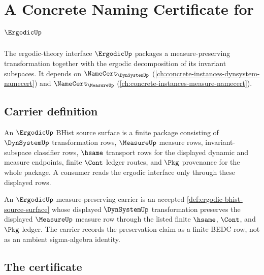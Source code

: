 \chapter{A Concrete Naming Certificate for $\ErgodicUp$}
\label{ch:concrete-instances-ergodic-namecert}

The ergodic-theory interface $\ErgodicUp$ packages a measure-preserving transformation together with the ergodic decomposition of its invariant subspaces. It depends on $\NameCert_{\DynSystemUp}$ (\autoref{ch:concrete-instances-dynsystem-namecert}) and $\NameCert_{\MeasureUp}$ (\autoref{ch:concrete-instances-measure-namecert}).

\section{Carrier definition}
\label{sec:ergodic-carrier}

\begin{definition}
\label{def:ergodic-bhist-source-surface}
An $\ErgodicUp$ BHist source surface is a finite package consisting of
$\DynSystemUp$ transformation rows, $\MeasureUp$ measure rows,
invariant-subspace classifier rows, $\hsame$ transport rows for the displayed
dynamic and measure endpoints, finite $\Cont$ ledger routes, and $\Pkg$
provenance for the whole package. A consumer reads the ergodic interface only
through these displayed rows.
\end{definition}

\begin{definition}
\label{def:ergodic-measure-preserving-carrier}
An $\ErgodicUp$ measure-preserving carrier is an accepted
\autoref{def:ergodic-bhist-source-surface} whose displayed $\DynSystemUp$
transformation preserves the displayed $\MeasureUp$ measure row through the
listed finite $\hsame$, $\Cont$, and $\Pkg$ ledger. The carrier records the
preservation claim as a finite BEDC row, not as an ambient sigma-algebra
identity.
\end{definition}


\section{The certificate}
\label{sec:ergodic-certificate}

